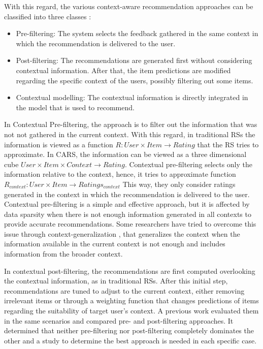 \documentclass[preprint]{elsarticle}
\begin{document}
\begin{spacing}{1.5}
With this regard, the various context-aware recommendation approaches can be classified into three classes \cite{Adomavicius2011}:
\begin{itemize}
	\item Pre-filtering: The system selects the feedback gathered in the same context in which the recommendation is delivered to the user.
	\item Post-filtering: The recommendations are generated first without considering contextual information. After that, the item predictions are modified regarding the specific context of the users, possibly filtering out some items.
	\item Contextual modelling: The contextual information is directly integrated in the model that is used to recommend.
\end{itemize}

In Contextual Pre-filtering, the approach is to filter out the information that was not not gathered in the current context. With this regard, in traditional RSs the information is viewed as a function $R: User \times Item \rightarrow Rating $ that the RS tries to approximate. In CARS, the information can be viewed as a three dimensional cube $User \times Item \times Context \rightarrow Rating$. Contextual pre-filtering selects only the information relative to the context, hence, it tries to approximate function $R_{context}: User \times Item \rightarrow Ratings_{context}$ This way, they only consider ratings generated in the context in which the recommendation is delivered to the user. Contextual pre-filtering is a simple and effective approach, but it is affected by data sparsity when there is not enough information generated in all contexts to provide accurate recommendations. Some researchers have tried to overcome this issue through context-generalization \cite{Adomavicius2011}, that generalizes the context when the information available in the current context is not enough and includes information from the broader context.

In contextual post-filtering, the recommendations are first computed overlooking the contextual information, as in traditional RSs. After this initial step, recommendations are tuned to adjust to the current context, either removing irrelevant items or through a weighting function that changes predictions of items regarding the suitability of target user's context. A previous work \cite{Panniello2009} evaluated them in the same scenarios and compared pre- and post-filtering approaches. It determined that neither pre-filtering nor post-filtering completely dominates the other and a study to determine the best approach is needed in each specific case.


\end{spacing}
\end{document}
